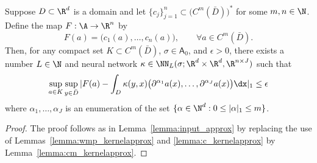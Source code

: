 \begin{lemma}
\label{lemma:cm_input_approx}
Suppose \(D \subset \R^d\) is a domain and let \(\{c_j\}_{j=1}^n \subset \bigl ( C^{m}(\bar{D}) \bigl )^*\) for some \(m, n \in \N\).
Define the map \(F : \A \to \R^n\) by 
\[F(a) = \bigl (c_1(a), \dots, c_n(a) \bigl ), \qquad \forall a \in C^m(\bar{D}).\]
Then, for any compact set \(K \subset C^m(\bar{D})\), \(\sigma \in \mathsf{A}_{0}\), and \(\epsilon > 0\), there exists 
a number \(L \in \N\) and neural network \(\kappa \in \NN_L(\sigma;\R^{d} \times \R^{d},\R^{n \times J})\) such that
\[\sup_{a \in K} \sup_{y \in \bar{D}} |F(a) - \int_{D} \kappa(y, x) \bigl (\partial^{\alpha_1} a(x), \dots, \partial^{\alpha_J} a(x) \bigl ) \dx |_1 \leq \epsilon \]
where \(\alpha_1,\dots,\alpha_J\) is an enumeration of the set \(\{\alpha \in \N^d : 0 \leq |\alpha|_1 \leq m\}\).
\end{lemma}
\begin{proof}
The proof follows as in Lemma~\ref{lemma:input_approx} by replacing the use of Lemmas~\ref{lemma:wmp_kernelapprox} and \ref{lemma:c_kernelapprox}
by Lemma~\ref{lemma:cm_kernelapprox}.
\end{proof}

